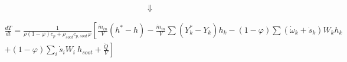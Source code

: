 \begin{equation*}
	\Downarrow
\end{equation*}


\begin{equation}
	\begin{split}
	\frac{dT}{dt}=
	\frac{1}{\rho\left(1-\varphi\right)c_p+\rho_{soot}c_{p,soot}\varphi}
	\left[
		\frac{{\dot{m}}_{in}}{V}
		\left(h^\ast-h\right)
		-\frac{{\dot{m}}_{in}}{V}\sum\left(Y_k^\ast-Y_k\right)h_k
		-\left(1-\varphi\right)\sum{\left({\dot{\omega}}_k
			+{\dot{s}}_k\right)W_kh_k}
	\right.
	\\
	\left.
	+\left(1-\varphi\right)\sum_{i}{{\dot{s}}_iW_i}\ h_{soot}+\frac{\dot{Q}}{V}
	\right]
	\end{split}
\end{equation}

